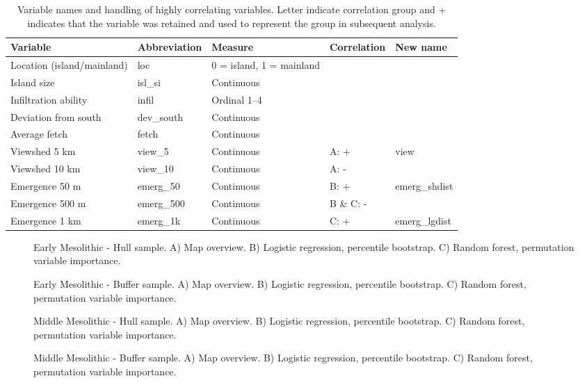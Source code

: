 \documentclass[12pt, a4paper]{article}
\begin{document}
\begin{table}
	\hskip-2.0cm\begin{tabular}{ | l | l | l | l | l |}
		\hline
		Variable & Abbreviation & Measure & Correlation & New name \\ \hline
		Location (island/mainland) & loc & 0 = island, 1 = mainland &&  \\ \hline
		Island size & isl\_si & Continuous && \\ \hline
		Infiltration ability & infil & Ordinal 1--4 &&\\ \hline
		Deviation from south & dev\_south & Continuous &&\\ \hline
		Average fetch & fetch &  Continuous &&\\ \hline
		Viewshed 5 km &  view\_5  & Continuous & A: + & view \\ \hline
		Viewshed 10 km &  view\_10  & Continuous & A: - &\\ \hline
		Emergence 50 m  & emerg\_50 & Continuous & B: + & emerg\_shdist \\ \hline
		Emergence 500 m & emerg\_500 & Continuous & B \& C: - &  \\ \hline
		Emergence 1 km & emerg\_1k & Continuous & C: + & emerg\_lgdist \\ \hline
		\hline
	\end{tabular}
	\caption[Variable names and handling of highly correlating variables.]{Variable names and handling of highly correlating variables. Letter indicate correlation group and + indicates that the variable was retained and used to represent the group in subsequent analysis.}
	\label{table:var}
\end{table}

\begin{figure}
	\caption[Early Mesolithic - Hull sample]{Early Mesolithic - Hull sample. A) Map overview. B) Logistic regression, percentile bootstrap. C) Random forest, permutation variable importance.}
	\label{fig:em_hull}
\bigbreak
	\caption[Early Mesolithic - Buffer sample]{Early Mesolithic - Buffer sample. A) Map overview. B) Logistic regression, percentile bootstrap. C) Random forest, permutation variable importance.}
	\label{fig:em_buff}
\end{figure}

\begin{figure}
	\caption[Middle Mesolithic - Hull sample]{Middle Mesolithic - Hull sample. A) Map overview. B) Logistic regression, percentile bootstrap. C) Random forest, permutation variable importance.}
	\label{fig:mm_hull}
\bigbreak
	\caption[Middle Mesolithic - Buffer sample]{Middle Mesolithic - Buffer sample. A) Map overview. B) Logistic regression, percentile bootstrap. C) Random forest, permutation variable importance.}
	\label{fig:mm_buff}
\end{figure}
	
\end{document}

